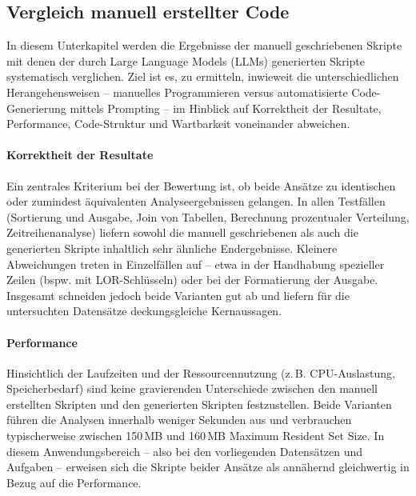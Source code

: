 \documentclass[11pt,a4paper]{article}
\begin{document}
\subsection{Vergleich manuell erstellter Code}
\label{sec:vergleich_manuell_llm}

In diesem Unterkapitel werden die Ergebnisse der manuell geschriebenen Skripte mit denen der durch Large Language Models (LLMs) generierten Skripte systematisch verglichen. Ziel ist es, zu ermitteln, inwieweit die unterschiedlichen Herangehensweisen -- manuelles Programmieren versus automatisierte Code-Generierung mittels Prompting -- im Hinblick auf Korrektheit der Resultate, Performance, Code-Struktur und Wartbarkeit voneinander abweichen.

\paragraph{Korrektheit der Resultate}
Ein zentrales Kriterium bei der Bewertung ist, ob beide Ansätze zu identischen oder zumindest äquivalenten Analyseergebnissen gelangen. In allen Testfällen (Sortierung und Ausgabe, Join von Tabellen, Berechnung prozentualer Verteilung, Zeitreihenanalyse) liefern sowohl die manuell geschriebenen als auch die generierten Skripte inhaltlich sehr ähnliche Endergebnisse. Kleinere Abweichungen treten in Einzelfällen auf -- etwa in der Handhabung spezieller Zeilen (bspw. mit LOR-Schlüsseln) oder bei der Formatierung der Ausgabe. Insgesamt schneiden jedoch beide Varianten gut ab und liefern für die untersuchten Datensätze deckungsgleiche Kernaussagen.

\paragraph{Performance}
Hinsichtlich der Laufzeiten und der Ressourcennutzung (z.\,B. CPU-Auslastung, Speicherbedarf) sind keine gravierenden Unterschiede zwischen den manuell erstellten Skripten und den generierten Skripten festzustellen. Beide Varianten führen die Analysen innerhalb weniger Sekunden aus und verbrauchen typischerweise zwischen 150\,MB und 160\,MB Maximum Resident Set Size. In diesem Anwendungsbereich -- also bei den vorliegenden Datensätzen und Aufgaben -- erweisen sich die Skripte beider Ansätze als annähernd gleichwertig in Bezug auf die Performance.
\end{document}
